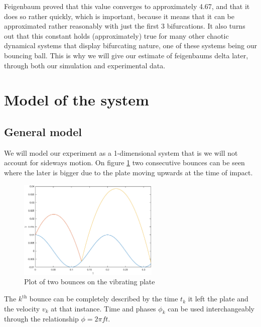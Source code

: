 \documentclass[12pt,oneside,a4paper]{article}
\numberwithin{equation}{section}
\begin{document}
{{{{Feigenbaum proved that this value converges to approximately 4.67, and that it does so rather quickly, which is important, because it means that it can be approximated rather reasonably with just the first 3 bifurcations. It also turns out that this constant holds (approximately) true for many other chaotic dynamical systems that display bifurcating nature, one of these systems being our bouncing ball. This is why we will give our estimate of feigenbaums delta later, through both our simulation and experimental data.




\section{Model of the system}
\label{modelling}
\subsection{General model}
We will model our experiment as a 1-dimensional system that is we will not account for sideways motion. On figure \ref{bounces} two consecutive bounces can be seen where the later is bigger due to the plate  moving upwards at the time of impact.
\begin{figure}[h]
	\centering
	\includegraphics[width=0.6\textwidth]{Figures/bounceplot.eps}
	\caption{Plot of two bounces on the vibrating plate}
	\label{bounces}
\end{figure}
The $k^{\text{th}}$ bounce can be completely described by the time $t_k$ it left the plate and the velocity $v_k$ at that instance. Time and phases $\phi_k$ can be used interchangeably through the relationship $\phi=2\pi f t$.

}}}}
\end{document}
